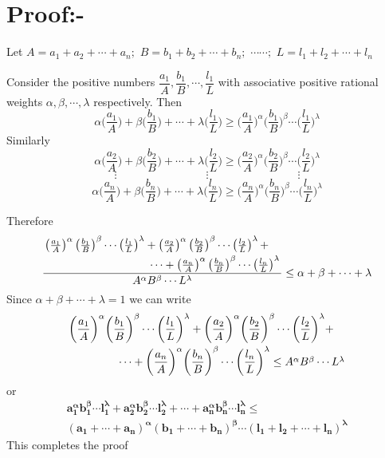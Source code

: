 \documentclass[12pt]{article}
\begin{document}
\color{black}
\pagebreak

\section{Proof:-}

Let $A=a_1+a_2+\cdots+a_n;$ $B=b_1+b_2+\cdots+b_n; $ $\cdots \cdots;$ $L=l_1+l_2+\cdots+l _n $

Consider the positive numbers $\dfrac{a_1}{A},\dfrac{b_1}{B},\cdots, \dfrac{l_1}{L}$ with associative positive rational weights $\alpha,\beta,\cdots,\lambda $ respectively. Then $$\alpha\bigg(\dfrac{a_1}{A}\bigg)+\beta\bigg(\dfrac{b_1}{B}\bigg)+\cdots+\lambda\bigg(\dfrac{l_1}{L}\bigg)\geq \bigg(\dfrac{a_1}{A}\bigg)^{\alpha}\bigg(\dfrac{b_1}{B}\bigg)^{\beta}\cdots\bigg(\dfrac{l_1}{L}\bigg)^{\lambda}$$Similarly $$\alpha\bigg(\dfrac{a_2}{A}\bigg)+\beta\bigg(\dfrac{b_2}{B}\bigg)+\cdots+\lambda\bigg(\dfrac{l_2}{L}\bigg)\geq \bigg(\dfrac{a_2}{A}\bigg)^{\alpha}\bigg(\dfrac{b_2}{B}\bigg)^{\beta}\cdots\bigg(\dfrac{l_2}{L}\bigg)^{\lambda}$$ $$\vdots\qquad\qquad\qquad\qquad \vdots \qquad\qquad\qquad\qquad \vdots$$ $$\alpha\bigg(\dfrac{a_n}{A}\bigg)+\beta\bigg(\dfrac{b_n}{B}\bigg)+\cdots+\lambda\bigg(\dfrac{l_n}{L}\bigg)\geq \bigg(\dfrac{a_n}{A}\bigg)^{\alpha}\bigg(\dfrac{b_n}{B}\bigg)^{\beta}\cdots\bigg(\dfrac{l_n}{L}\bigg)^{\lambda}$$
\pagebreak 

Therefore
 $$\displaystyle{\frac{\splitdfrac{\left(\frac{a_1}{A}\right)^{\alpha}\left(\frac{b_1}{B}\right)^{\beta}\cdots\left(\frac{l_1}{L}\right)^{\lambda} +  \left(\frac{a_2}{A}\right)^{\alpha}\left(\frac{b_2}{B}\right)^{\beta}\cdots\left(\frac{l_2}{L}\right)^{\lambda}+}{\cdots + \left(\frac{a_n}{A}\right)^{\alpha}\left(\frac{b_n}{B}\right)^{\beta}\cdots\left(\frac{l_n}{L}\right)^{\lambda}}}{A^{\alpha}B^{\beta}\cdots L^{\lambda}}\leq \alpha+\beta +\cdots+\lambda}$$Since $ \alpha+\beta +\cdots+\lambda=1$ we can write $$\splitdfrac{\bigg(\dfrac{a_1}{A}\bigg)^{\alpha}\bigg(\dfrac{b_1}{B}\bigg)^{\beta}\cdots\bigg(\dfrac{l_1}{L}\bigg)^{\lambda} +  \bigg(\dfrac{a_2}{A}\bigg)^{\alpha}\bigg(\dfrac{b_2}{B}\bigg)^{\beta}\cdots\bigg(\dfrac{l_2}{L}\bigg)^{\lambda}+}{\cdots + \bigg(\dfrac{a_n}{A}\bigg)^{\alpha}\bigg(\dfrac{b_n}{B}\bigg)^{\beta}\cdots\bigg(\dfrac{l_n}{L}\bigg)^{\lambda}\leq A^{\alpha}B^{\beta}\cdots L^{\lambda}}$$or 
\begin{multline*}
\boldsymbol{a_{1}^{\alpha} b_{1}^{\beta} \cdots l_{1}^{\lambda}+a_{2}^{\alpha} b_{2}^{\beta} \cdots l_{2}^{\lambda}+\cdots + a_{n}^{\alpha} b_{n}^{\beta} \cdots l_{n}^{\lambda}\leq }\\
\boldsymbol{  \left( a_{1}+\cdots+a_{n} \right)^{\alpha} \left( b_{1}+\cdots +b_{n}\right)^{\beta} \cdots \left(l_{1}+l_{2}+\cdots+l_{n}\right)^{\lambda} }
\end{multline*}
This completes the proof
\pagebreak
\end{document}

